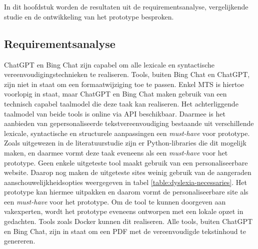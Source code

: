 \chapter{}%
\label{ch:resultaten}

In dit hoofdstuk worden de resultaten uit de requirementsanalyse, vergelijkende studie en de ontwikkeling van het prototype besproken. 

\section{Requirementsanalyse}


ChatGPT en Bing Chat zijn capabel om alle lexicale en syntactische vereenvoudigingstechnieken te realiseren. Tools, buiten Bing Chat en ChatGPT, zijn niet in staat om een formaatwijziging toe te passen. Enkel MTS is hiertoe voorlopig in staat, maar ChatGPT en Bing Chat maken gebruik van een technisch capabel taalmodel die deze taak kan realiseren. Het achterliggende taalmodel van beide tools is online via API beschikbaar. Daarmee is het aanbieden van gepersonaliseerde tekstvereenvoudiging bestaande uit verschillende lexicale, syntactische en structurele aanpassingen een \textit{must-have} voor prototype. Zoals uitgewezen in de literatuurstudie zijn er Python-libraries die dit mogelijk maken, en daarmee vormt deze taak eveneens als een \textit{must-have} voor het prototype. Geen enkele uitgeteste tool maakt gebruik van een personaliseerbare website. Daarop nog maken de uitgeteste sites weinig gebruik van de aangeraden aanschouwelijkheidsopties weergegeven in tabel \ref{table:dyslexia-necessaries}. Het prototype kan hiermee uitpakken en daarom vormt de personaliseerbare site als een \textit{must-have} voor het prototype. Om de tool te kunnen doorgeven aan vakexperten, wordt het prototype eveneens ontworpen met een lokale opzet in gedachten. Tools zoals Docker kunnen dit realiseren. Alle tools, buiten ChatGPT en Bing Chat, zijn in staat om een PDF met de vereenvoudigde tekstinhoud te genereren.

